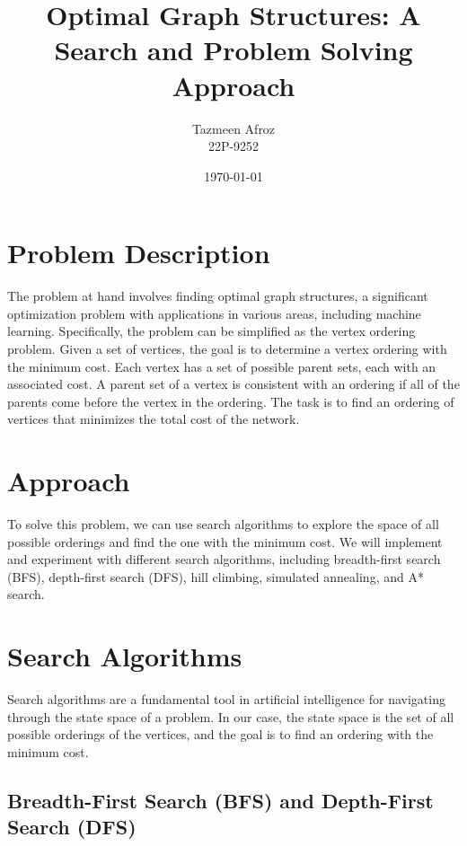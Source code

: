 \documentclass{article}
\begin{document}
\title{Optimal Graph Structures: A Search and Problem Solving Approach}
\author{Tazmeen Afroz\\ 22P-9252}
\date{\today}

\maketitle

\section{Problem Description}

The problem at hand involves finding optimal graph structures, a significant optimization problem with applications in various areas, including machine learning. Specifically, the problem can be simplified as the vertex ordering problem. Given a set of vertices, the goal is to determine a vertex ordering with the minimum cost. Each vertex has a set of possible parent sets, each with an associated cost. A parent set of a vertex is consistent with an ordering if all of the parents come before the vertex in the ordering. The task is to find an ordering of vertices that minimizes the total cost of the network.

\section{Approach}

To solve this problem, we can use search algorithms to explore the space of all possible orderings and find the one with the minimum cost. We will implement and experiment with different search algorithms, including breadth-first search (BFS), depth-first search (DFS), hill climbing, simulated annealing, and A* search.

\section{Search Algorithms}

Search algorithms are a fundamental tool in artificial intelligence for navigating through the state space of a problem. In our case, the state space is the set of all possible orderings of the vertices, and the goal is to find an ordering with the minimum cost.

\subsection{Breadth-First Search (BFS) and Depth-First Search (DFS)}
\end{document}
